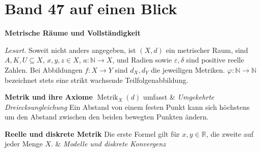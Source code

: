 \chapter[Band 47: Metrische Räume und Vollständigkeit]{Band 47 auf einen Blick}
\noindent\textbf{Metrische Räume und Vollständigkeit}\par\medskip
\noindent\emph{Lesart.}
Soweit nicht anders angegeben, ist \((X,d)\) ein metrischer Raum,
sind \(A,K,U\subseteq X\), \(x,y,z\in X\), \(a\colon\mathbb N\to X\),
und Radien sowie \(\varepsilon,\delta\) sind positive reelle Zahlen.
Bei Abbildungen \(f\colon X\to Y\) sind \(d_X,d_Y\) die jeweiligen Metriken.
\(\varphi\colon\mathbb N\to\mathbb N\) bezeichnet stets eine strikt
wachsende Teilfolgenabbildung.

\begin{BandUebersicht}
\textbf{Metrik und ihre Axiome}
\(\operatorname{Metrik}_X(d)\) umfasst
&
\textit{Umgekehrte Dreiecksungleichung}
Ein Abstand von einem festen Punkt kann sich höchstens um den
Abstand zwischen den beiden bewegten Punkten ändern.
\\ \addlinespace[.8ex]

\textbf{Reelle und diskrete Metrik}
Die erste Formel gilt für \(x,y\in\mathbb R\), die zweite auf jeder Menge \(X\).
&
\textit{Modelle und diskrete Konvergenz}
\\ \addlinespace[.8ex]


\end{BandUebersicht}
